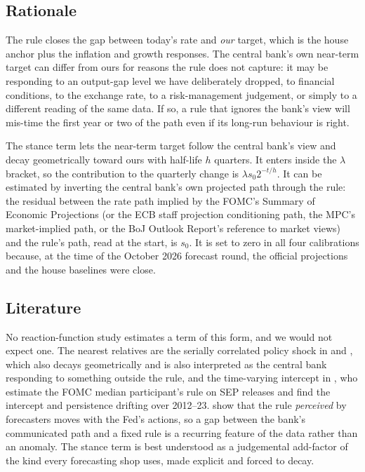 \documentclass[11pt,a4paper]{article}
\begin{document}
\subsection{Rationale}

The rule closes the gap between today's rate and \emph{our} target, which is the house anchor plus the inflation and growth responses. The central bank's own near-term target can differ from ours for reasons the rule does not capture: it may be responding to an output-gap level we have deliberately dropped, to financial conditions, to the exchange rate, to a risk-management judgement, or simply to a different reading of the same data. If so, a rule that ignores the bank's view will mis-time the first year or two of the path even if its long-run behaviour is right.

The stance term lets the near-term target follow the central bank's view and decay geometrically toward ours with half-life $h$ quarters. It enters inside the $\lambda$ bracket, so the contribution to the quarterly change is $\lambda s_0 2^{-t/h}$. It can be estimated by inverting the central bank's own projected path through the rule: the residual between the rate path implied by the FOMC's Summary of Economic Projections (or the ECB staff projection conditioning path, the MPC's market-implied path, or the BoJ Outlook Report's reference to market views) and the rule's path, read at the start, is $s_0$. It is set to zero in all four calibrations because, at the time of the October 2026 forecast round, the official projections and the house baselines were close.

\subsection{Literature}

No reaction-function study estimates a term of this form, and we would not expect one. The nearest relatives are the serially correlated policy shock in \textcite{rudebusch2002} and \textcite{english2003}, which also decays geometrically and is also interpreted as the central bank responding to something outside the rule, and the time-varying intercept in \textcite{gonzalez2023}, who estimate the FOMC median participant's rule on SEP releases and find the intercept and persistence drifting over 2012--23. \textcite{bauerpflueger2024} show that the rule \emph{perceived} by forecasters moves with the Fed's actions, so a gap between the bank's communicated path and a fixed rule is a recurring feature of the data rather than an anomaly. The stance term is best understood as a judgemental add-factor of the kind every forecasting shop uses, made explicit and forced to decay.
\end{document}

